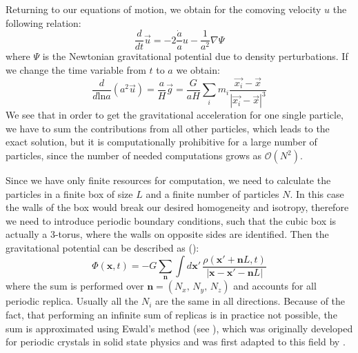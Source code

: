 Returning to our equations of motion, 
we obtain for the comoving velocity $u$ the following relation:
\begin{equation}
\frac{d}{dt}\vec{u}=-2\frac{\dot{a}}{a}u-\frac{1}{a^{2}}\nabla\Psi
\end{equation}
where $\Psi$ is the Newtonian gravitational potential due to density
perturbations. If we change the time variable from $t$ to $a$ we
obtain:
\begin{equation}
\frac{d}{d\mbox{ln}a}(a^{2}\vec{u})=\frac{a}{H}\vec{g}=\frac{G}{aH}\sum_{i}m_{i}\frac{\vec{x_{i}}-\vec{x}}{\left|\vec{x_{i}}-\vec{x}\right|^{3}}
\end{equation}
We see that in order to get the gravitational acceleration for one
single particle, we have to sum the contributions from all other particles,
which leads to the exact solution, but it is computationally prohibitive
for a large number of particles, since the number of needed computations
grows as $\mathcal{O}(N^{2})$. 

Since we have only finite resources for computation, we need to calculate
the particles in a finite box of size $L$ and a finite number of
particles $N$. In this case the walls of the box would break our
desired homogeneity and isotropy, therefore we need to introduce periodic
boundary conditions, such that the cubic box is actually a 3-torus,
where the walls on opposite sides are identified. Then the gravitational
potential can be described as (\citet{dehnen_n-body_2011}): 
\begin{equation}
\Phi(\mathbf{x},t)=-G\sum_{\mathbf{n}}\int d\mathbf{x}'\,\frac{\rho(\mathbf{x}'+\mathbf{n}L,t)}{\left|\mathbf{x-x}'-\mathbf{n}L\right|}
\end{equation}
where the sum is performed over $\mathbf{n}=(N_{x},\,N_{y},\,N_{z})$
and accounts for all periodic replica. Usually all the $N_{i}$ are
the same in all directions. Because of the fact, that performing an
infinite sum of replicas is in practice not possible, the sum is approximated
using Ewald's method (see \citet{ewald_berechnung_1921}), which was
originally developed for periodic crystals in solid state physics
and was first adapted to this field by \citet{hernquist_application_1991}.

